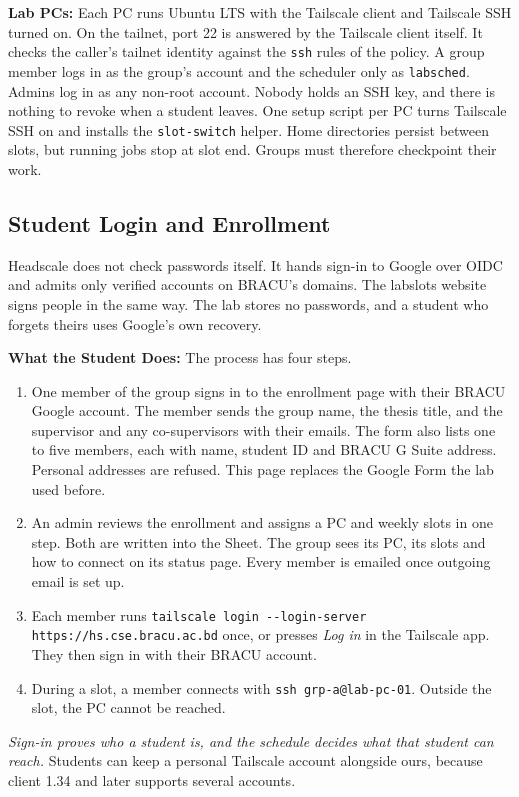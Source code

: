 \documentclass[11pt,a4paper]{article}
\newcommand{\code}[1]{\texttt{#1}}
\begin{document}
\textbf{Lab PCs:} Each PC runs Ubuntu LTS with the Tailscale client and
Tailscale SSH turned on. On the tailnet, port 22 is answered by the Tailscale
client itself. It checks the caller's tailnet identity against the \code{ssh}
rules of the policy. A group member logs in as the group's account and the
scheduler only as \code{labsched}. Admins log in as any non-root account. Nobody
holds an SSH key, and there is nothing to revoke when a student leaves. One setup
script per PC turns Tailscale SSH on and installs the \code{slot-switch} helper.
Home directories persist between slots, but running jobs stop at slot end.
Groups must therefore checkpoint their work.

\subsection{Student Login and Enrollment}

Headscale does not check passwords itself. It hands sign-in to Google over OIDC
and admits only verified accounts on BRACU's domains. The labslots website signs
people in the same way. The lab stores no passwords, and a student who forgets
theirs uses Google's own recovery.

\textbf{What the Student Does:} The process has four steps.
\begin{enumerate}[leftmargin=1.6em]
  \item One member of the group signs in to the enrollment page with their BRACU
        Google account. The member sends the group name, the thesis title, and
        the supervisor and any co-supervisors with their emails. The form also
        lists one to five members, each with name, student ID and BRACU G Suite
        address. Personal addresses are refused. This page replaces the Google
        Form the lab used before.
  \item An admin reviews the enrollment and assigns a PC and weekly slots in one
        step. Both are written into the Sheet. The group sees its PC, its slots
        and how to connect on its status page. Every member is emailed once
        outgoing email is set up.
  \item Each member runs \code{tailscale login -{}-login-server}
        \code{https://hs.cse.bracu.ac.bd} once, or presses \emph{Log in} in the
        Tailscale app. They then sign in with their BRACU account.
  \item During a slot, a member connects with \code{ssh grp-a@lab-pc-01}.
        Outside the slot, the PC cannot be reached.
\end{enumerate}
\emph{Sign-in proves who a student is, and the schedule decides what that student
can reach.} Students can keep a personal Tailscale account alongside ours,
because client 1.34 and later supports several accounts.
\end{document}
